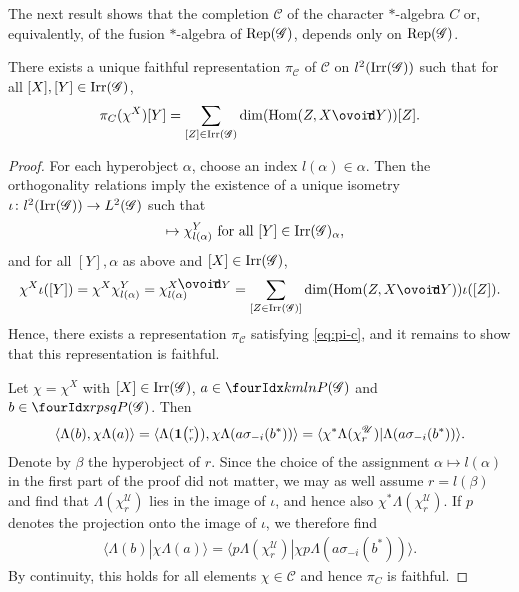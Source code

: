 The next result shows that the completion $\mathcal{C}$ of the
character $*$-algebra $C$ or, equivalently, of the fusion
$*$-algebra of $\mathrm{Rep}(\mathscr{G})$,  depends only on
$\mathrm{Rep}(\mathscr{G})$.

\begin{Prop}
  There exists a unique faithful representation $\pi_{\mathcal{C}}$ of
  $\mathcal{C}$ on $l^{2}(\mathrm{Irr}(\mathscr{G}))$ such that for all
  $[X],[Y] \in \mathrm{Irr}(\mathscr{G})$,
  \begin{align} \label{eq:pi-c}
    \pi_{C}(\chi^{X})[Y] = \sum_{[Z] \in \Irr(\mathscr{G})}
    \dim(\Hom(Z,X\Circt Y))[Z].
  \end{align}
\end{Prop}
\begin{proof}
  For each hyperobject $\alpha$, choose an index $l(\alpha) \in
  \alpha$. Then the orthogonality relations \cite[Corollary
2.23]{DCT1} imply the existence of a unique isometry $\iota\colon
  l^{2}(\mathrm{Irr}(\mathscr{G})) \to L^{2}(\mathscr{G})$ such that
\begin{align*}
  [Y] &\mapsto \chi^{Y}_{l(\alpha)} \text{ for all } [Y] \in
  \Irr(\mathscr{G})_{\alpha},
\end{align*}
 and for all $[Y],\alpha$ as above and $[X] \in
\mathrm{Irr}(\mathscr{G})$,
\begin{align*}
  \chi^{X}\iota([Y]) = \chi^{X}\chi^{Y}_{l(\alpha)} = \chi^{X \Circt
    Y}_{l(\alpha)} =  \sum_{[Z \in \Irr(\mathscr{G})]}
  \dim(\Hom(Z,X\Circt Y)) \iota([Z]).
\end{align*}
Hence,   there   exists  a representation $\pi_{\mathcal{C}}$ 
satisfying \eqref{eq:pi-c}, and it remains to show that this
representation is faithful. 

Let $\chi = \chi^X$ with $[X] \in \mathrm{Irr}(\mathscr{G})$, $a\in
\Gr{P(\mathscr{G})}{k}{l}{m}{n}$ and $b\in
\Gr{P(\mathscr{G})}{r}{s}{p}{q}$. Then
\begin{align*}
  \langle
\Lambda(b),\chi \Lambda(a)\rangle = \langle \Lambda(
\mathbf{1}{\tiny {\begin{pmatrix} r\\r\end{pmatrix}}}),\chi \Lambda(a\sigma_{-i}(b^*))\rangle  =
 \langle \chi^{*} \Lambda(\chi^{\mathscr{U}}_{r})  |
 \Lambda(a\sigma_{-i}(b^*))\rangle.
\end{align*}
Denote by $\beta$ the hyperobject of $r$. Since the choice of the
assignment $\alpha \mapsto l(\alpha)$ in the first part of the proof
did not matter,  we may as well assume
$r=l(\beta)$ and find that $\Lambda(\chi^{\mathscr{U}}_{r})$ lies in
the image of $\iota$, and hence also $\chi^{*}
\Lambda(\chi^{\mathscr{U}}_{r})$. If $p$ denotes the projection onto
the image of $\iota$, we therefore find
\begin{align*}
  \langle
\Lambda(b) | \chi \Lambda(a)\rangle = 
 \langle p \Lambda(\chi^{\mathscr{U}}_{r})  | \chi
p \Lambda(a\sigma_{-i}(b^*))\rangle.
\end{align*}
By continuity, this holds for all elements $\chi \in \mathcal{C}$ and hence $\pi_{C}$ is faithful.
\end{proof}


